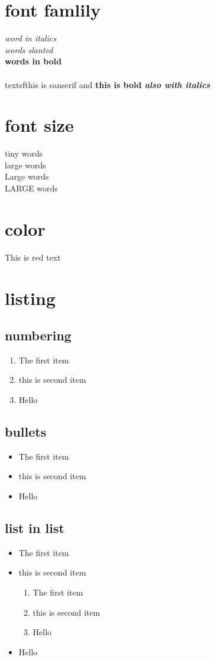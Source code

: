 \documentclass[12pt]{article}
\begin{document}
\section{font famlily}
\textit{word in italics}\\
\textsl{words slanted}\\
\textbf{words in bold}\\
\\textsf{this is sanserif and \textbf{this is bold\textit{ also with italics}}}\\

\section{font size}
{\tiny tiny words}\\
{\large large words}\\
{\Large Large words}\\
{\LARGE LARGE words}\\

\section{color}
{\color{red} This is red text}

\section{listing}
\subsection{numbering}
\begin{enumerate}
\item The first item
\item this is second item
\item Hello
\end{enumerate}

\subsection{bullets}
\begin{itemize}
\item The first item
\item this is second item
\item Hello
\end{itemize}

\subsection{list in list}
\begin{itemize}
\item The first item
\item this is second item
\begin{enumerate}
\item The first item
\item this is second item
\item Hello
\end{enumerate}
\item Hello
\end{itemize}
\end{document}
